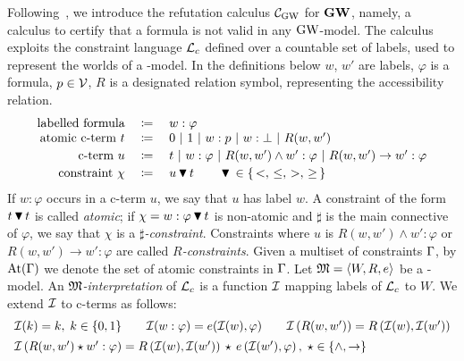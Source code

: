Following~\cite{BilkovaFK:22,FerFioRod:2025}, we introduce the
refutation calculus $\mathcal{C}_{\mathrm{GW}}$ for $\mathbf{GW}$, namely, a calculus to certify
that a formula is not valid in any $\mbox{$\mathrm{GW}$}$-model.  The calculus
exploits the constraint language $\mathcal{L}_c$ defined over a countable set
of labels, used to represent the worlds of a \GWM-model.  In the
 definitions  below $w$, $w'$ are labels, $\varphi$  is a
formula, $p\in \mathcal{V}$, $R$ is a designated relation symbol, representing
the accessibility relation.
\[
\begin{array}{rcl}
  \mbox{labelled formula} & \;\coloneqq&\; w :\varphi                            
  \\
  \mbox{atomic c-term $t$}  &\; \coloneqq&\; 0~|~1~|~w :p~|~w :\bot~|~R(w,w')
  \\[.5ex]
  \mbox{c-term $u$}  & \;\coloneqq&\; t~|~w : \varphi~|~R(w,w')\land w':\varphi~|~R(w,w')\to w':\varphi
  \\[.5ex]
  \mbox{constraint $\chi$}   &\; \coloneqq&\; u \,\blacktriangledown\, t \qquad \,\blacktriangledown\,\in \{\,<,\,\leq,\,>,\,\geq\,\}
\end{array}
\]
If  $w:\varphi$ occurs in   a c-term $u$, we say  that $u$ has label $w$.
A constraint of the form $t \,\blacktriangledown\, t$ is called \emph{atomic};
if $\chi= w:\varphi \,\blacktriangledown\, t$ is non-atomic and $\sharp$ is
the main connective of $\varphi$, we say that $\chi$ is a
\emph{$\sharp$-constraint}.
Constraints where $u$ is   $R(w,w')\land w':\varphi$ or
$R(w,w')\to w':\varphi$ are called
\emph{$R$-constraints}.
Given a multiset of constraints $\Gamma$, by
$\mathrm{At}(\Gamma)$ we denote the set of atomic constraints in $\Gamma$.
Let $\mathfrak{M}=\langle W,R,e \rangle$ be a \GWM-model. An \emph{$\mathfrak{M}$-interpretation} of
$\mathcal{L}_c$ is a function $\mathcal{I}$ mapping labels of $\mathcal{L}_c$ to $W$.
We extend $\mathcal{I}$ to c-terms as follows:
\[
  \begin{array}{l}
    \mathcal{I}(k) = k,\;k\in\{0,1\}
    \qquad
    \mathcal{I}( w:\varphi) = e(\mathcal{I}(w), \varphi)
    \qquad
    \mathcal{I}\left(R(w,w')\right) =  R\left(\mathcal{I}(w),\mathcal{I}(w')\right)
    \\[1ex]
    \mathcal{I}\left(R(w,w') \star w':\varphi\right) =
   R\left(\mathcal{I}(w),\mathcal{I}(w')\right) \,\star\, e\left(\mathcal{I}(w'),\varphi\right),\;\star\in\{\land, \to\}
  \end{array}
\]  

